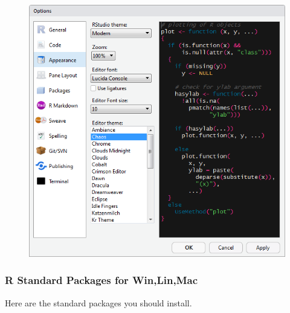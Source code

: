 \documentclass[10pt]{article} %
\begin{document}
\begin{itemize}
  \begin{figure}[h!]
    \centering
    \includegraphics[width=0.6\linewidth]{figs/chaos}
    \caption{}
    \label{fig:chaos}
  \end{figure}
\end{itemize}


\subsubsection{R Standard Packages for Win,Lin,Mac}\label{subsubsec:rstandpack}

Here are the standard packages you should install.
\end{document}
